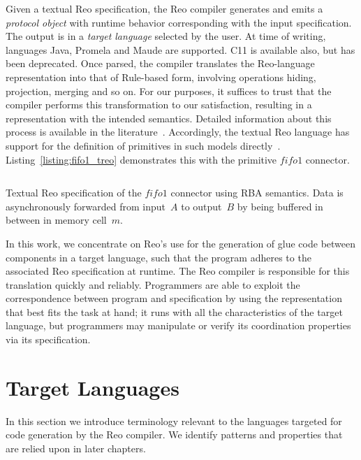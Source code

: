 Given a textual Reo specification, the Reo compiler generates and emits a \textit{protocol object} with runtime behavior corresponding with the input specification. The output is in a \textit{target language} selected by the user. At time of writing, languages Java, Promela and Maude are supported. C11 is available also, but has been deprecated. Once parsed, the compiler translates the Reo-language representation into that of Rule-based form, involving operations hiding, projection, merging and so on. For our purposes, it suffices to trust that the compiler performs this transformation to our satisfaction, resulting in a representation with the intended semantics. Detailed information about this process is available in the literature~\cite{arbab2004reo, arbab2005abstract, dokter2018rule}. Accordingly, the textual Reo language has support for the definition of primitives in such models directly~\cite{dokter2018treo}. Listing~\ref{listing:fifo1_treo} demonstrates this with the primitive $fifo1$ connector. 


\begin{listing}[ht]
	\inputminted[]{text}{fifo1.rba.treo}
	\caption[Fifo1 connector specfication in textual Reo language.]{Textual Reo specification of the $fifo1$ connector using RBA semantics. Data is asynchronously forwarded from input~$A$ to output~$B$ by being buffered in between in memory cell~$m$.}
	\label{listing:fifo1_treo}
\end{listing}

In this work, we concentrate on Reo's use for the generation of glue code between components in a target language, such that the program adheres to the associated Reo specification at runtime. The Reo compiler is responsible for this translation quickly and reliably. Programmers are able to exploit the correspondence between program and specification by using the representation that best fits the task at hand; it runs with all the characteristics of the target language, but programmers may manipulate or verify its coordination properties via its specification.


\section{Target Languages}
In this section we introduce terminology relevant to the languages targeted for code generation by the Reo compiler. We identify patterns and properties that are relied upon in later chapters.


